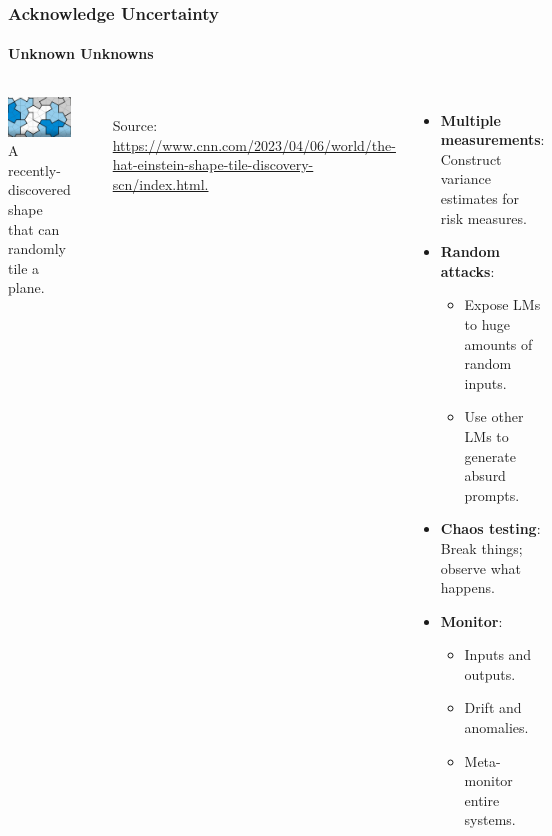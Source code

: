 \documentclass[11pt,
               aspectratio=169,
               hyperref={colorlinks}
               ]{beamer}
\begin{document}
		\begin{frame}
			
			\frametitle{Acknowledge Uncertainty}
			\framesubtitle{Unknown Unknowns}
			
			\begin{columns}
				\centering
				\newline
				\includegraphics[width=\textwidth]{../img/uncertainty.jpg} 
				\newline
				\tiny{A recently-discovered shape that can randomly tile a plane.}
				
				\par\noindent\rule{100pt}{0.4pt}\\
				\vspace{5pt}
				\scriptsize{\tiny{Source: \url{https://www.cnn.com/2023/04/06/world/the-hat-einstein-shape-tile-discovery-scn/index.html.}}}

				\begin{itemize}
					\item \textbf{Multiple measurements}: Construct variance estimates for risk measures.
					\item \textbf{Random attacks}:
						\begin{itemize}
							\item Expose LMs to huge amounts of random inputs.
							\item Use other LMs to generate absurd prompts.
						\end{itemize}
					\item \textbf{Chaos testing}: Break things; observe what happens.
					\item \textbf{Monitor}:
						\begin{itemize}
							\item Inputs and outputs.
							\item Drift and anomalies.
							\item Meta-monitor entire systems.
						\end{itemize}
				\end{itemize}
			\end{columns}
					
		\end{frame}
		
\end{document}
